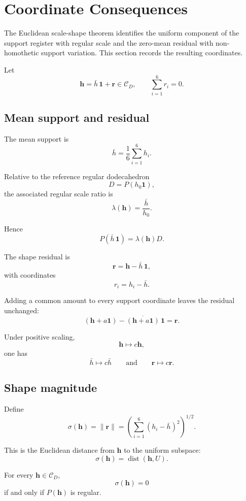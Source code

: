 \section{Coordinate Consequences}

The Euclidean scale-shape theorem identifies the uniform component of the
support register with regular scale and the zero-mean residual with
non-homothetic support variation. This section records the resulting
coordinates.

Let
\[
\mathbf h
=
\bar h\,\mathbf 1+\mathbf r
\in\mathcal C_D,
\qquad
\sum_{i=1}^{6}r_i=0.
\]

\subsection{Mean support and residual}

The mean support is
\[
\bar h
=
\frac{1}{6}\sum_{i=1}^{6}h_i.
\]

Relative to the reference regular dodecahedron
\[
D=P(h_0\mathbf 1),
\]
the associated regular scale ratio is
\[
\lambda(\mathbf h)
=
\frac{\bar h}{h_0}.
\]

Hence
\[
P(\bar h\,\mathbf 1)
=
\lambda(\mathbf h)D.
\]

The shape residual is
\[
\mathbf r
=
\mathbf h-\bar h\,\mathbf 1,
\]
with coordinates
\[
r_i=h_i-\bar h.
\]

Adding a common amount to every support coordinate leaves the residual
unchanged:
\[
(\mathbf h+a\mathbf 1)
-
\overline{(\mathbf h+a\mathbf 1)}\,\mathbf 1
=
\mathbf r.
\]

Under positive scaling,
\[
\mathbf h\longmapsto c\mathbf h,
\]
one has
\[
\bar h\longmapsto c\bar h
\qquad\text{and}\qquad
\mathbf r\longmapsto c\mathbf r.
\]

\subsection{Shape magnitude}

Define
\[
\sigma(\mathbf h)
=
\|\mathbf r\|
=
\left(
\sum_{i=1}^{6}(h_i-\bar h)^2
\right)^{1/2}.
\]

This is the Euclidean distance from \(\mathbf h\) to the uniform subspace:
\[
\sigma(\mathbf h)
=
\operatorname{dist}(\mathbf h,U).
\]

\begin{corollary}
For every \(\mathbf h\in\mathcal C_D\),
\[
\sigma(\mathbf h)=0
\]
if and only if \(P(\mathbf h)\) is regular.
\end{corollary}

